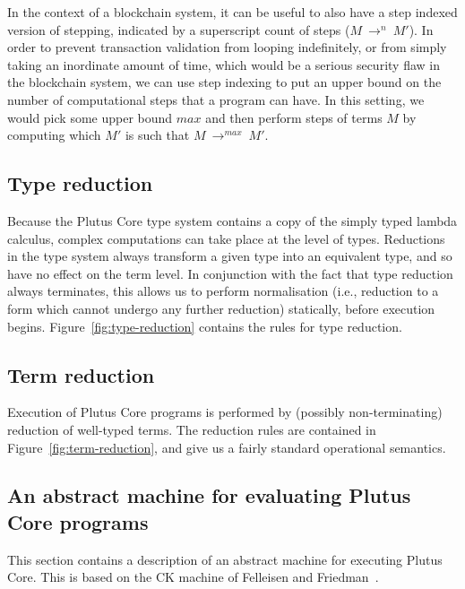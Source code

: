 \documentclass[a4paper]{article}
\newcommand{\multistepIndexed}[3]{#1 ~ \rightarrow^{#2} ~ #3}
\begin{document}
In the context of a blockchain system, it can be useful to also have a
step indexed version of stepping, indicated by a superscript count of
steps (\(\multistepIndexed{M}{n}{M'}\)). In order to prevent
transaction validation from looping indefinitely, or from simply
taking an inordinate amount of time, which would be a serious security
flaw in the blockchain system, we can use step indexing to put an
upper bound on the number of computational steps that a program can
have. In this setting, we would pick some upper bound $\mathit{max}$
and then perform steps of terms $M$ by computing which $M'$ is such
that \(\multistepIndexed{M}{\mathit{max}}{M'}\).


\newpage 

\subsection{Type reduction}
Because the Plutus Core type system contains a copy of the simply
typed lambda calculus, complex computations can take place at the
level of types.  Reductions in the type system always transform a
given type into an equivalent type, and so have no effect on the term
level.  In conjunction with the fact that type reduction always
terminates, this allows us to perform normalisation (i.e., reduction to
a form which cannot undergo any further reduction) statically, before
execution begins.  Figure~\ref{fig:type-reduction} contains the rules
for type reduction.




\subsection{Term reduction}
Execution of Plutus Core programs is performed by (possibly
non-terminating) reduction of well-typed terms.  The reduction rules
are contained in Figure~\ref{fig:term-reduction}, and give us a fairly
standard operational semantics.



\subsection{An abstract machine for evaluating Plutus Core programs}
This section contains a description of an abstract machine for
executing Plutus Core.  This is based on the CK machine of Felleisen
and Friedman~\cite{Felleisen-CK-CEK}. 
\end{document}
